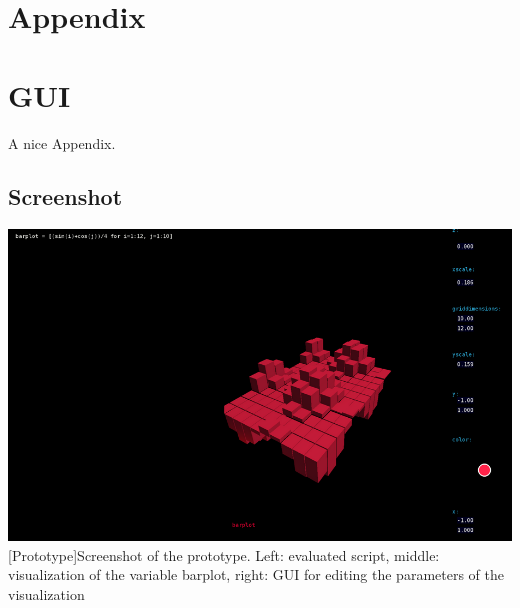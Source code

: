 \setcounter{page}{1}

\begin{appendix}
\section*{Appendix}
{}

\section{GUI}
A nice Appendix.

\subsection*{Screenshot}
\begin{minipage}{\linewidth}
    \centering
    \includegraphics[scale=2.0]{Bilder/screenshot.png}
    [Prototype]{Screenshot of the prototype. Left: evaluated script, middle: visualization of the variable barplot, right: GUI for editing the parameters of the visualization}
    \label{app:screenshot}
\end{minipage}

\end{appendix}
